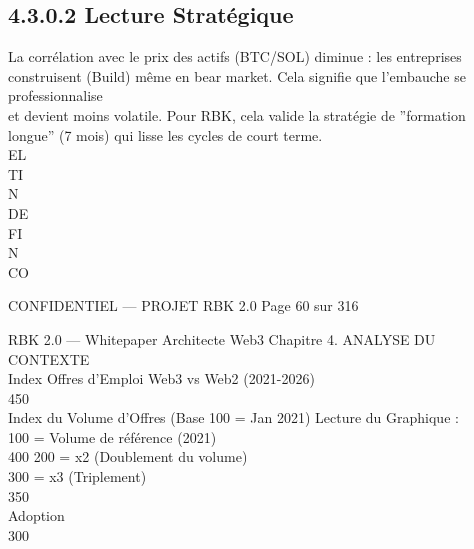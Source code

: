 \subsection{4.3.0.2 Lecture Stratégique}
La corrélation avec le prix des actifs (BTC/SOL) diminue : les entreprises construisent (Build) même en bear market. Cela signifie que l’embauche se professionnalise\\
et devient moins volatile. Pour RBK, cela valide la stratégie de ”formation longue” (7 mois) qui lisse les cycles de court terme.\\
\vspace{0.5em}
\vspace{0.5em}
\vspace{0.5em}
\vspace{0.5em}
EL\\
TI\\
N\\
DE\\
FI\\
N\\
CO\\
\vspace{0.5em}
\vspace{0.5em}
\vspace{0.5em}
\vspace{0.5em}
\begin{confidential}CONFIDENTIEL — PROJET RBK 2.0                                              Page 60 sur 316\end{confidential}
RBK 2.0 — Whitepaper Architecte Web3                                                                                                                                            Chapitre 4. ANALYSE DU CONTEXTE\\
\vspace{0.5em}
\vspace{0.5em}
Index Offres d’Emploi Web3 vs Web2 (2021-2026)\\
450\\
Index du Volume d’Offres (Base 100 = Jan 2021)           Lecture du Graphique :\\
100 = Volume de référence (2021)\\
400     200 = x2 (Doublement du volume)\\
300 = x3 (Triplement)\\
\vspace{0.5em}
350\\
\vspace{0.5em}
Adoption\\
300\\
